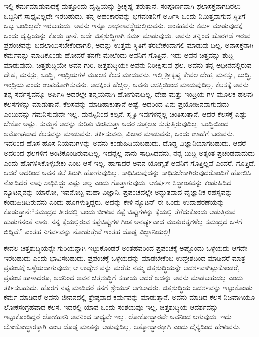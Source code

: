 ಇಲ್ಲಿ ಕರ್ಮಮಾಡುವುದಕ್ಕೆ ಮತ್ತೊಂದು ದೃಷ್ಟಿಯನ್ನು ಶ್ರೀಕೃಷ್ಣ ತರುತ್ತಾನೆ. ಸಂಪೂರ್ಣವಾಗಿ ಫಲಾಸಕ್ತನಾಗದಿರಲು ಒಬ್ಬನಿಗೆ ಸಾಧ್ಯವಿಲ್ಲದೇ ಇರಬಹುದು, ತನ್ನ ಅಹಂಕಾರವನ್ನು ಭಗವಂತನಿಗೆ ಅರ್ಪಿಸಿ ಒಂದು ನಿಮಿತ್ತವಾಗುವ ಸ್ಥಿತಿಗೆ ಒಬ್ಬ ಬಂದಿಲ್ಲದೇ ಇರಬಹುದು. ಅವನು ಇನ್ನೂ ಸಾಧನಾವಸ್ಥೆಯಲ್ಲಿರುವನು. ಅಂತಹವನು ಕರ್ಮ ಮಾಡುವುದಕ್ಕೆ ಒಂದು ದೃಷ್ಟಿಯನ್ನು ಕೊಡು ತ್ತಾನೆ. ಅದೇ ಚಿತ್ತಶುದ್ಧಿಗಾಗಿ ಕರ್ಮ ಮಾಡುವುದು. ಅವನು ತನ್ನಿಂದ ಹೊರಗಡೆ ಇರುವ ಪ್ರಪಂಚವನ್ನು ಬದಲಾಯಿಸಬೇಕೆಂದಾಗಲಿ, ಅದನ್ನು ಉತ್ತಮ ಸ್ಥಿತಿಗೆ ತರಬೇಕೆಂದಾಗಲಿ ಮಾಡುವು ದಿಲ್ಲ. ಅನಾಸಕ್ತನಾಗಿ ಕರ್ಮವನ್ನು ಮಾಡಿಕೊಂಡು ಹೋದರೆ ತನಗೇ ಮೇಲೆಂದು ಅವನಿಗೆ ಗೊತ್ತಿದೆ. ಇದು ಅವನ ಚಿತ್ತವನ್ನು ಶುದ್ಧಿ ಮಾಡುವುದು. ಚಿತ್ತಶುದ್ಧಿಯೇ ಅವನ ಗುರಿ. ಚಿತ್ತಶುದ್ಧಿಯೇ ಅವನು ನಿರೀಕ್ಷಿಸುವ ಫಲ. ಅವನು ತನ್ನ ಅಧೀನದಲ್ಲಿರುವ ದೇಹ, ಮನಸ್ಸು, ಬುದ್ಧಿ, ಇಂದ್ರಿಯಗಳ ಮೂಲಕ ಕೆಲಸ ಮಾಡುವನು. ಇಲ್ಲಿ ಶ್ರೀಕೃಷ್ಣ ಕೇವಲ ದೇಹ, ಮನಸ್ಸು, ಬುದ್ಧಿ, ಇಂದ್ರಿಯ ಎಂದು ಉಪಯೋಗಿಸುವನು. ಅದಕ್ಕಿಂತ ಹೆಚ್ಚಿಲ್ಲ. ಅವನು ಆಸಕ್ತಿಯಿಂದ ಮಾಡುವುದಿಲ್ಲ. ಕೆಲಸಕ್ಕೆ ಅವನು ತನ್ನ ಸರ್ವಸ್ವವನ್ನೂ ಅರ್ಪಿಸಿ ಅದರಲ್ಲೇ ತನ್ಮಯನಾಗಿ ಹೋಗುವುದಿಲ್ಲ. ದೇಹ ಮತ್ತು ಇಂದ್ರಿಯ ಗಳ ಮೂಲಕ ಹಲವು ಕೆಲಸಗಳನ್ನು ಮಾಡುತ್ತಾನೆ. ಕೆಲಸವನ್ನು ಮಾಡಿಹಾಕುತ್ತಾನೆ ಅಷ್ಟೆ. ಅದರಿಂದ ಏನು ಪ್ರಯೋಜನವಾಗುವುದು ಎಂಬುದನ್ನು ಗಮನಿಸುವುದೇ ಇಲ್ಲ. ಮನಸ್ಸಿನಿಂದ ಕಲ್ಪನೆ, ಸ್ಮೃತಿ ಇವುಗಳನ್ನೆಲ್ಲ ಚಿಂತಿಸುತ್ತಾನೆ. ಆದರೆ ಕೆಲಸಕ್ಕೆ ಎಷ್ಟು ಬೇಕೋ ಅಷ್ಟು. ಸುಮ್ಮನೆ ಅದನ್ನು ಕುರಿತು ಚಿಂತಿಸುತ್ತಾ ಅದರ ಸುತ್ತಲೂ ಸುತ್ತುತ್ತಿರುವುದಿಲ್ಲ. ಬುದ್ಧಿಯಿಂದ ಅಮೋಘವಾದ ಕೆಲಸವನ್ನು ಮಾಡುವನು. ತರ್ಕಿಸುವನು, ವಿಚಾರ ಮಾಡುವನು, ಒಂದು ಊಹೆಗೆ ಬರುವನು. ಇದರಿಂದ ಹೊಸ ಹೊಸ ನಿಯಮಗಳನ್ನು ಅವನು ಕಂಡುಹಿಡಿಯಬಹುದು. ದೊಡ್ಡ ವಿಜ್ಞಾನಿಯಾಗಬಹುದು. ಆದರೆ ಅದರಿಂದ ಫಲಗಳಿಗೆ ಅಂಟಿಕೊಂಡಿರುವುದಿಲ್ಲ. ಇದನ್ನೆಲ್ಲ ನಾನು ಸಾಧಿಸಿದವನು, ನನ್ನ ಬುದ್ಧಿ ಅತ್ಯಂತ ಪ್ರಚಂಡವಾದುದು ಎಂದು ಹೊಗಳಿಸಿಕೊಳ್ಳಬೇಕು ಎಂಬ ಆಸೆ ಇಲ್ಲ. ಹಾಗಾದರೆ ಅವನ ಯೋಗ್ಯತೆ ಅವನಿಗೆ ಗೊತ್ತಿಲ್ಲವೆ ಎಂದರೆ, ಗೊತ್ತಿದೆ, ಆದರೆ ಅದರಿಂದ ಅವನ ತಲೆ ತಿರುಗಿ ಹೋಗುವುದಿಲ್ಲ. ಸಾಧಿಸಿರುವುದನ್ನು ಸಾಧಿಸಬೇಕಾಗಿರುವುದರೊಂದಿಗೆ ಹೋಲಿಸಿ ನೋಡಿದರೆ ನಾವು ಸಾಧಿಸಿದ್ದು ಎಷ್ಟು ಅಲ್ಪ ಎಂದು ಗೊತ್ತಾಗುವುದು. ಆಕರ್ಷಣ ಸಿದ್ಧಾಂತವನ್ನು ಕಂಡುಹಿಡಿದ ನ್ಯೂಟನ್ನನನ್ನು ಯಾರೋ, ಇವನೊಬ್ಬ ಮಹಾ ವಿಜ್ಞಾನಿ, ಪ್ರಪಂಚದಲ್ಲೇ ಅದ್ಭುತವಾದ ವೈಜ್ಞಾನಿಕ ರಹಸ್ಯವನ್ನು ಕಂಡುಹಿಡಿದಿರುವನು ಎಂದು ಹೊಗಳುತ್ತಿದ್ದರು. ಅದನ್ನು ಕೇಳಿ ನ್ಯೂಟನ್ ಈ ಒಂದು ಉದಾಹರಣೆಯನ್ನು ಕೊಡುತ್ತಾನೆ:“ಸಮುದ್ರದ ತೀರದಲ್ಲಿ ಬಂದು ಬೀಳುವ ಕಪ್ಪೆ ಚಿಪ್ಪುಗಳನ್ನು ಕೈಯಲ್ಲಿ ತೆಗೆದುಕೊಂಡು ಆಡುತ್ತಿರುವ ಹುಡುಗನಂತೆ ನಾನು. ನನ್ನ ಕೈಯಲ್ಲಿರುವ ಕಪ್ಪೆಚಿಪ್ಪುಗಳಿ ಗಿಂತ ಅನರ್ಘ್ಯವಾದ ಮುತ್ತುರತ್ನಗಳೆಲ್ಲ ಸಮುದ್ರದ ಒಳಗೆ ಬಿದ್ದಿವೆ.” ಎಂತಹ ನಿಗರ್ವವನ್ನು ನೋಡುತ್ತೇವೆ ಇಂತಹ ದೊಡ್ಡ ವಿಜ್ಞಾನಿಯಲ್ಲಿ!

ಕೇವಲ ಚಿತ್ತಶುದ್ಧಿಯನ್ನೇ ಗುರಿಯನ್ನಾಗಿ ಇಟ್ಟುಕೊಂಡರೆ ಅಂತಹವರಿಂದ ಪ್ರಪಂಚಕ್ಕೆ ಅಷ್ಟೊಂದು ಒಳ್ಳೆಯದು ಆಗದೇ ಇರಬಹುದು ಎಂದು ಭಾವಿಸಬಹುದು. ಪ್ರಪಂಚಕ್ಕೆ ಒಳ್ಳೆಯದನ್ನು ಮಾಡಬೇಕೆಂಬ ಉದ್ದೇಶದಿಂದ ಮಾಡಿದರೆ ಮಾತ್ರ ಪ್ರಪಂಚಕ್ಕೆ ಒಳ್ಳೆಯದಾಗುವುದು; ಆ ಉದ್ದೇಶ ವನ್ನು ಮರೆತು ನಮ್ಮ ಚಿತ್ತಶುದ್ಧಿಯನ್ನೇ ಆದರ್ಶವಾಗಿಟ್ಟುಕೊಂಡರೆ, ಪ್ರಪಂಚ ಹಾಳಾದರೂ, ಅದರಿಂದ ಅವನ ಚಿತ್ತಶುದ್ಧಿಗೆ ಸಹಾಯ ಆದರೆ ಅದನ್ನು ಅವನು ಮಾಡಬಹುದಲ್ಲ ಎಂದು ತರ್ಕಿಸಬಹುದು. ಹೊರಗೆ ನಷ್ಟ ಮಾಡಿದರೆ ತನಗೆ ಶ್ರೇಯಸ್ ಆಗಲಾದರು. ಚಿತ್ತಶುದ್ಧಿಯ ಆದರ್ಶವನ್ನು ಇಟ್ಟುಕೊಂಡು ಕರ್ಮ ಮಾಡಿದರೆ ಅವನು ಜೀವನದಲ್ಲಿ ಶ್ರೇಷ್ಠವಾದ ಕರ್ಮವನ್ನು ಮಾಡುತ್ತಾನೆ. ಅವನು ಮಾಡಿದ ಕೆಲಸ ನಿಜವಾಗಿಯೂ ಲೋಕಸಂಗ್ರಹವಾದ ಕೆಲಸ. ಇದರಲ್ಲಿ ಯಾವ ಒಂದು ಸಂಶಯವೂ ಇಲ್ಲ. ಚಿತ್ತಶುದ್ಧಿಯ ಆದರ್ಶವನ್ನು ಇಟ್ಟುಕೊಂಡಿದ್ದರೆ ಲೋಕಹಾನಿ ಅವನಿಂದ ಸಾಧ್ಯವೇ ಇಲ್ಲ. ಲೋಕೋದ್ಧಾರವೇ ಅವನಿಂದ ಆಗುವುದು. ಇದು ಲೋಕೋದ್ಧಾರಕ್ಕಾಗಿ ಎಂಬ ದೊಡ್ಡ ಮಾತನ್ನು ಆಡುವುದಿಲ್ಲ. ಆತ್ಮೋದ್ಧಾರಕ್ಕಾಗಿ ಎಂದು ದೈನ್ಯದಿಂದ ಹೇಳುವನು.

